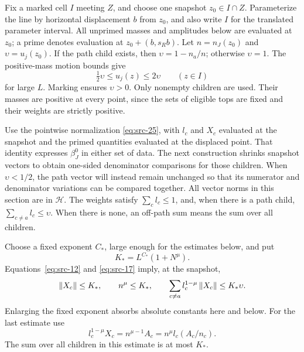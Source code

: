 Fix a marked cell \(I\) meeting \(Z\), and choose one snapshot
\(z_0\in I\cap Z\). Parameterize the line by horizontal displacement
\(b\) from \(z_0\), and also write \(I\) for the translated parameter
interval. All unprimed masses and amplitudes below are evaluated at
\(z_0\); a prime denotes evaluation at \(z_0+(b,s_Rb)\).
Let \(n=n_J(z_0)\) and \(\upsilon=u_j(z_0)\).
If the path child exists, then \(\upsilon=1-n_a/n\); otherwise
\(\upsilon=1\). The positive-mass motion bounds give
\begin{equation}
 \tfrac12\upsilon\le u_j(z)\le2\upsilon\qquad(z\in I)
 \label{pred:drop-comparability}
\end{equation}
for large \(L\). Marking ensures \(\upsilon>0\).
Only nonempty children are used. Their masses are positive at every
point, since the sets of eligible tops are fixed and their weights are
strictly positive.

Use the pointwise normalization \eqref{eq:src-25}, with \(l_c\) and
\(X_c\) evaluated at the snapshot and the primed quantities evaluated
at the displaced point. That identity expresses \(\beta_J^0\) in either
set of data. The next construction shrinks snapshot vectors to obtain
one-sided denominator comparisons for those children. When
\(\upsilon<1/2\), the path vector will instead remain unchanged so that
its numerator and denominator variations can be compared together.
All vector norms in this section are in \(\mathcal H\).
The weights satisfy \(\sum_c l_c\le1\), and, when there is a path
child, \(\sum_{c\ne a}l_c\le\upsilon\). When there is none,
an off-path sum means the sum over all children.

Choose a fixed exponent \(C_*\), large enough for the estimates below,
and put
\begin{equation}
 K_*=L^{C_*}(1+N^\mu).
 \label{pred:amplitude-scale}
\end{equation}
Equations~\eqref{eq:src-12} and \eqref{eq:src-17} imply, at the
snapshot,
\begin{equation}
 \left\|X_c\right\|\le K_*,\qquad n^\mu\le K_*,\qquad
 \sum_{c\ne a}l_c^{1-\mu}\left\|X_c\right\|\le K_*\upsilon.
 \label{pred:snapshot-size}
\end{equation}
Enlarging the fixed exponent absorbs absolute constants here and below.
For the last estimate use
\[
 l_c^{1-\mu}X_c=n^{\mu-1}A_c
              =n^\mu l_c(A_c/n_c).
\]
The sum over all children in this estimate is at most \(K_*\).

